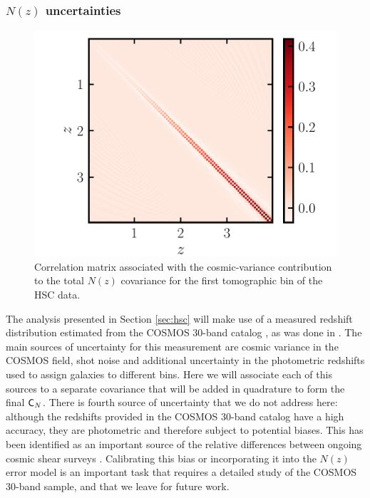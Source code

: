 \documentclass[a4paper,11pt]{article}
\begin{document}
      \subsubsection{$N(z)$ uncertainties}\label{sssec:theory.prior.cv}
        \begin{figure}[ht]
          \centering  
          \includegraphics[width=1.\textwidth]{./corr_CV_0}
          \caption{Correlation matrix associated with the cosmic-variance contribution to the total $N(z)$ covariance for the first tomographic bin of the HSC data.}\label{fig:CV}
        \end{figure}
        The analysis presented in Section \ref{sec:hsc} will make use of a measured redshift distribution estimated from the COSMOS 30-band catalog \cite{2016ApJS..224...24L}, as was done in \cite{1912.08209}. The main sources of uncertainty for this measurement are cosmic variance in the COSMOS field, shot noise and additional uncertainty in the photometric redshifts used to assign galaxies to different bins. Here we will associate each of this sources to a separate covariance that will be added in quadrature to form the final ${\sf C}_N$. There is fourth source of uncertainty that we do not address here: although the redshifts provided in the COSMOS 30-band catalog have a high accuracy, they are photometric and therefore subject to potential biases. This has been identified as an important source of the relative differences between ongoing cosmic shear surveys \citep{2020A&A...638L...1J}. Calibrating this bias or incorporating it into the $N(z)$ error model is an important task that requires a detailed study of the COSMOS 30-band sample, and that we leave for future work.
        
\end{document}
